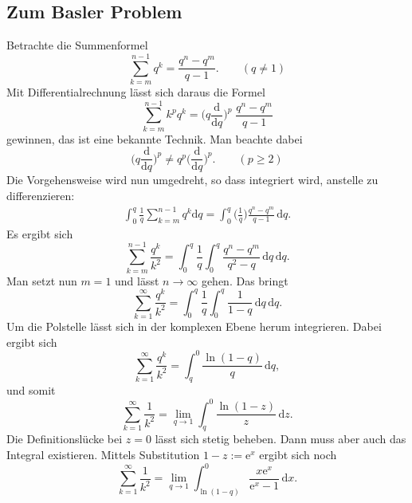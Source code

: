 \documentclass[a4paper,10pt,fleqn,twocolumn,twoside,dvipdfmx]{scrartcl}
\numberwithin{equation}{section}
\newcommand{\ee}{\mathrm e}
\theoremstyle{rmbox}
\begin{document}
\subsection{Zum Basler Problem}
Betrachte die Summenformel
\begin{equation}
\sum_{k=m}^{n-1} q^k = \frac{q^n-q^m}{q-1}.\qquad (q\ne 1)
\end{equation}
Mit Differentialrechnung lässt sich daraus die Formel
\begin{equation}
\sum_{k=m}^{n-1} k^p q^k 
= \Big(q\frac{\mathrm d}{\mathrm dq}\Big)^p\;\frac{q^n-q^m}{q-1}
\end{equation}
gewinnen, das ist eine bekannte Technik. Man beachte dabei
\begin{equation}
\Big(q\frac{\mathrm d}{\mathrm dq}\Big)^p
\ne q^p \Big(\frac{\mathrm d}{\mathrm dq}\Big)^p.\qquad (p\ge 2)
\end{equation}
Die Vorgehensweise wird nun umgedreht, so dass integriert wird,
anstelle zu differenzieren:
\begin{gather}
\int_0^q \frac{1}{q}\sum_{k=m}^{n-1} q^k \mathrm dq
= \int_0^q\bigg(\frac{1}{q}\bigg)\frac{q^n-q^m}{q-1}\,\mathrm dq.
\end{gather}
Es ergibt sich
\begin{equation}
\sum_{k=m}^{n-1}\frac{q^k}{k^2}
= \int_0^q\frac{1}{q}\int_0^q\frac{q^n-q^m}{q^2-q}\,\mathrm dq\,\mathrm dq.
\end{equation}
Man setzt nun $m=1$ und lässt $n\to\infty$ gehen.
Das bringt%
\begin{equation}
\sum_{k=1}^\infty\frac{q^k}{k^2}
= \int_0^q\frac{1}{q}\int_0^q\frac{1}{1-q}\,\mathrm dq\,\mathrm dq.
\end{equation}
Um die Polstelle lässt sich in der komplexen Ebene herum integrieren.
Dabei ergibt sich%
\begin{equation}
\sum_{k=1}^\infty\frac{q^k}{k^2}
= \int_q^0 \frac{\ln(1-q)}{q}\,\mathrm dq,
\end{equation}
und somit
\begin{equation}
\sum_{k=1}^\infty\frac{1}{k^2}
= \lim_{q\to 1}\int_q^0 \frac{\ln(1-z)}{z}\,\mathrm dz.
\end{equation}
Die Definitionslücke bei $z=0$ lässt sich stetig beheben. Dann muss
aber auch das Integral existieren. Mittels Substitution $1-z:=\ee^x$
ergibt sich noch
\begin{equation}
\sum_{k=1}^\infty\frac{1}{k^2}
= \lim_{q\to 1}\int_{\ln(1-q)}^0 \frac{x\ee^x}{\ee^x-1}\,\mathrm dx.
\end{equation}
\end{document}
